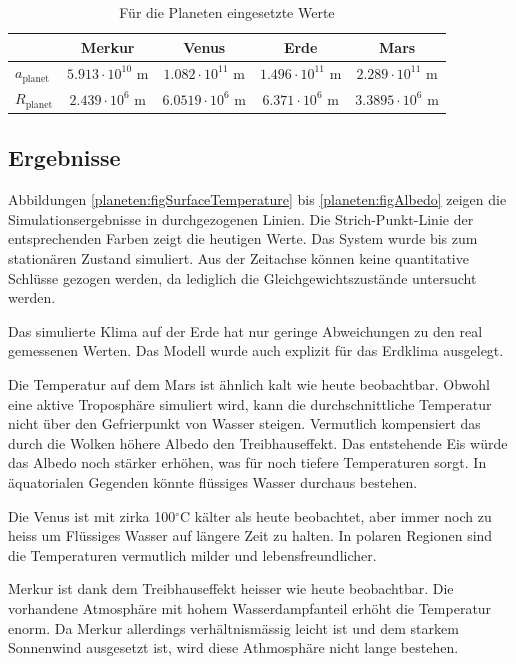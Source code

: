 \begin{refsection}
\begin{center}
\begin{table}[!h]
	\center
	\begin{tabular}{l|c c c c}
                        & Merkur                    & Venus                    & Erde                    & Mars     \\
  \hline
  $a_{\text{planet}}$   & $5.913 \cdot 10^{10}$ m   & $1.082 \cdot 10^{11}$ m  & $1.496 \cdot 10^{11}$ m & $2.289 \cdot 10^{11}$ m \\
  $R_{\text{planet}}$   & $2.439 \cdot 10^{6}$ m   & $6.0519 \cdot 10^{6}$ m  & $6.371 \cdot 10^{6}$ m  & $3.3895 \cdot 10^{6}$ m 
\end{tabular}
\caption{Für die Planeten eingesetzte Werte \cite{planeten:radius} \cite{planeten:semiMinorAxis}}
\label{planeten:planetValues}
\end{table}
\end{center}

\subsection{Ergebnisse}

	Abbildungen \ref{planeten:figSurfaceTemperature} bis \ref{planeten:figAlbedo} zeigen die Simulationsergebnisse in durchgezogenen Linien. Die Strich-Punkt-Linie der entsprechenden Farben zeigt die heutigen Werte. Das System wurde bis zum stationären Zustand simuliert. Aus der Zeitachse können keine quantitative Schlüsse gezogen werden, da lediglich die Gleichgewichtszustände untersucht werden.
		
	Das simulierte Klima auf der Erde hat nur geringe Abweichungen zu den real gemessenen Werten. Das Modell wurde auch explizit für das Erdklima ausgelegt.
	
	Die Temperatur auf dem Mars ist ähnlich kalt wie heute beobachtbar. Obwohl eine aktive Troposphäre simuliert wird, kann die durchschnittliche Temperatur nicht über den Gefrierpunkt von Wasser steigen. Vermutlich kompensiert das durch die Wolken höhere Albedo den Treibhauseffekt. Das entstehende Eis würde das Albedo noch stärker erhöhen, was für noch tiefere Temperaturen sorgt. In äquatorialen Gegenden könnte flüssiges Wasser durchaus bestehen.
	
	Die Venus ist mit zirka 100$^\circ$C kälter als heute beobachtet, aber immer noch zu heiss um Flüssiges Wasser auf längere Zeit zu halten. In polaren Regionen sind die Temperaturen vermutlich milder und lebensfreundlicher.
	
	Merkur ist dank dem Treibhauseffekt heisser wie heute beobachtbar. Die vorhandene Atmosphäre mit hohem Wasserdampfanteil erhöht die Temperatur enorm. Da Merkur allerdings verhältnismässig leicht ist und dem starkem Sonnenwind ausgesetzt ist, wird diese Athmosphäre nicht lange bestehen.


\end{refsection}
